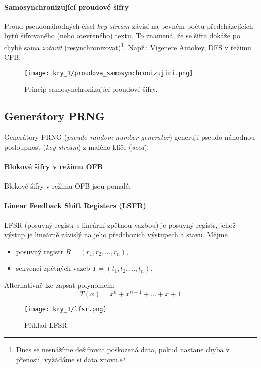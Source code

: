 \paragraph*{Samosynchronizující proudové šifry} Proud pseudonáhodných čísel \textit{key stream} závisí na pevném počtu předcházejících bytů šifrovaného (nebo otevřeného) textu. To znamená, že se šifra dokáže po chybě sama \textit{zotavit} (resynchronizovat)\footnote{Dnes se nesnážíme dešifrovat poškozená data, pokud nastane chyba v přenosu, vyžádáme si data znovu.}. Např.: Vigenere Autokey, DES v řežimu CFB.

\begin{figure}[H]
    \centering
    \texttt{[image: kry\_1/proudova\_samosynchronizujici.png]}
    \caption{Princip samosynchronizující proudové šifry.}
\end{figure}

\subsection*{Generátory PRNG}

Generátory PRNG (\textit{pseudo-random number generator}) generují pseudo-náhodnou pos\-loupnost (\textit{key stream}) z malého klíče (\textit{seed}).

\paragraph*{Blokové šifry v režimu OFB} Blokové šifry v režimu OFB jsou pomalé.

\paragraph*{Linear Feedback Shift Registers (LSFR)} LFSR (posuvný registr s lineární zpětnou vazbou) je posuvný registr, jehož výstup je lineárně závislý na jeho předchozích výstupech a stavu. Mějme \begin{itemize}
    \item posuvný registr $R = (r_1, r_2, \dots, r_n)$,
    \item sekvenci zpětných vazeb $T = (t_1, t_2, \dots, t_n)$.
\end{itemize}

\noindent Alternativně lze zapsat polynomem: $$
T(x) = x^n + x^{n-1} + \ldots + x + 1
$$

\begin{figure}[H]
    \centering
    \texttt{[image: kry\_1/lfsr.png]}
    \caption{Příklad LFSR.}
\end{figure}

